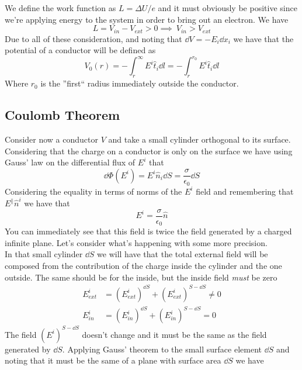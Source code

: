 \documentclass[../electromagnetism]{subfiles}
\begin{document}
We define the work function as $L=\Delta U/e$ and it must obviously be positive since we're applying energy to the system in order to bring out an electron. We have
\begin{equation}
	L=V_{in}-V_{ext}>0\implies\ V_{in}>V_{ext}
	\label{eq:potcond}
\end{equation}
Due to all of these consideration, and noting that $\dd V=-E_i\dd x_i$ we have that the potential of a conductor will be defined as
\begin{equation}
	V_0(r)=-\int_{r}^{\infty}E^i\hat{t}_i\dd l=-\int_{r}^{r_0}E^i\hat{t}_i\dd l
	\label{eq:potentialcond}
\end{equation}
Where $r_0$ is the ''first`` radius immediately outside the conductor.\\
\subsection{Coulomb Theorem}
Consider now a conductor $V$ and take a small cylinder orthogonal to its surface. Considering that the charge on a conductor is only on the surface we have using Gauss' law on the differential flux of $E^i$ that
\begin{equation}
	\dd\Phi(E^i)=E^i\hat{n}_i\dd S=\frac{\sigma}{\epsilon_0}\dd S
	\label{eq:glcondsur}
\end{equation}
Considering the equality in terms of norms of the $E^i$ field and remembering that $E^\parallel\hat{n}^i$ we have that
\begin{equation}
	E^i=\frac{\sigma}{\epsilon_0}\hat{n}
	\label{eq:fieldconductor}
\end{equation}
You can immediately see that this field is twice the field generated by a charged infinite plane. Let's consider what's happening with some more precision.\\
In that small cylinder $\dd S$ we will have that the total external field will be composed from the contribution of the charge inside the cylinder and the one outside. The same should be for the inside, but the inside field \textit{must} be zero
\begin{equation*}
	\begin{aligned}
		E^i_{ext}&=\left(E^i_{ext}\right)^{\dd S}+\left(E^i_{ext}\right)^{S-\dd S}\ne0\\
		E^i_{in}&=\left(E^i_{in}\right)^{\dd S}+\left(E^i_{in}\right)^{S-\dd S}=0
	\end{aligned}
\end{equation*}
The field $\left(E^i\right)^{S-\dd S}$ doesn't change and it must be the same as the field generated by $\dd S$. Applying Gauss' theorem to the small surface element $\dd S$ and noting that it must be the same of a plane with surface area $\dd S$ we have
\end{document}
